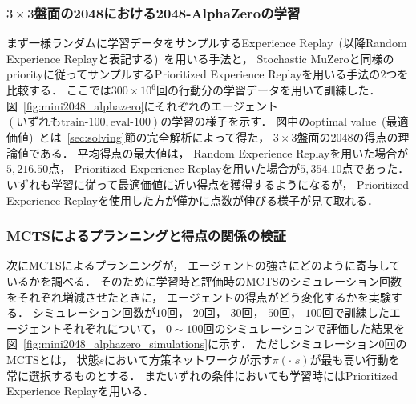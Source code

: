 \subsubsection{$3\times3$盤面の2048における2048-AlphaZeroの学習}
まず一様ランダムに学習データをサンプルするExperience Replay~(以降Random Experience Replayと表記する)~を用いる手法と， Stochastic MuZeroと同様のpriorityに従ってサンプルするPrioritized Experience Replayを用いる手法の$2$つを比較する．
ここでは$300\times{10}^6$回の行動分の学習データを用いて訓練した．
図~\ref{fig:mini2048_alphazero}にそれぞれのエージェント$(\text{いずれもtrain-}100,\text{eval-}100)$の学習の様子を示す．
図中のoptimal value~(最適価値)~とは~\ref{sec:solving}節の完全解析によって得た， $3\times3$盤面の2048の得点の理論値である．
平均得点の最大値は， Random Experience Replayを用いた場合が$5,216.50$点， Prioritized Experience Replayを用いた場合が$5,354.10$点であった．
いずれも学習に従って最適価値に近い得点を獲得するようになるが， Prioritized Experience Replayを使用した方が僅かに点数が伸びる様子が見て取れる．

\subsubsection{MCTSによるプランニングと得点の関係の検証}
次にMCTSによるプランニングが， エージェントの強さにどのように寄与しているかを調べる．
そのために学習時と評価時のMCTSのシミュレーション回数をそれぞれ増減させたときに， エージェントの得点がどう変化するかを実験する．
シミュレーション回数が$10$回， $20$回， $30$回， $50$回， $100$回で訓練したエージェントそれぞれについて， $0 \sim 100$回のシミュレーションで評価した結果を図~\ref{fig:mini2048_alphazero_simulations}に示す．
ただしシミュレーション$0$回のMCTSとは， 状態$s$において方策ネットワークが示す$\pi(\cdot|s)$が最も高い行動を常に選択するものとする．
またいずれの条件においても学習時にはPrioritized Experience Replayを用いる．

